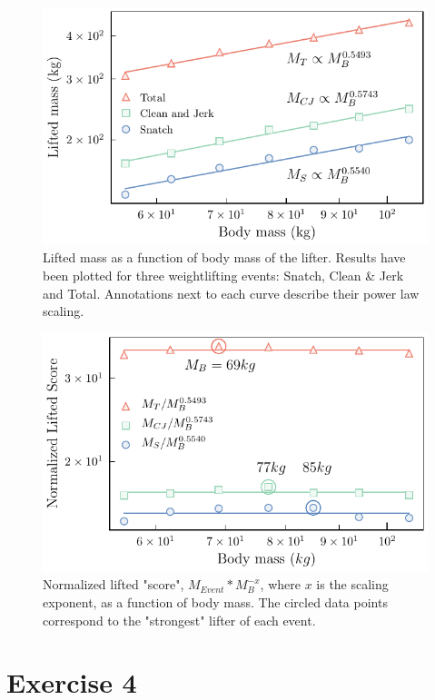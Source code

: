 \documentclass{article}
\begin{document}
\begin{figure}[h]
  \includegraphics[width=\linewidth]{Q03/liftingPowerLaw.pdf}
  \caption{Lifted mass as a function of body mass of the lifter. Results have been plotted for three weightlifting events: Snatch, Clean \& Jerk and Total. Annotations next to each curve describe their power law scaling.}
  \label{fig:liftingPowerLawPlot}
\end{figure}
\begin{figure}[t]
  \includegraphics[width=\linewidth]{Q03/liftingPowerLawNormed.pdf}
  \caption{Normalized lifted "score", $M_{Event}*M_B^{-x}$, where $x$ is the scaling exponent, as a function of body mass. The circled data points correspond to the "strongest" lifter of each event.}
  \label{fig:liftingPowerLawPlot}
\end{figure}

\section{Exercise 4}
\end{document}
